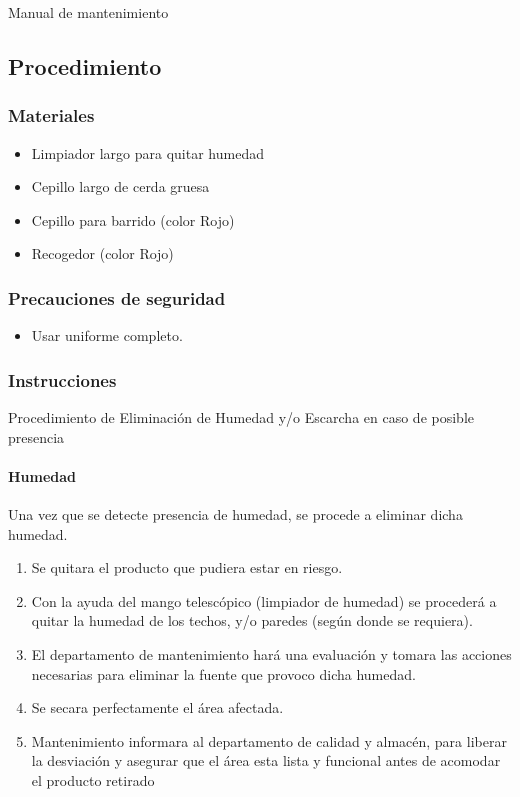Manual de mantenimiento %

\subsection{Procedimiento}

\subsubsection{Materiales}

\begin{itemize}
	\item Limpiador largo para quitar humedad
	\item Cepillo largo de cerda gruesa
	\item Cepillo para barrido (color Rojo)
	\item Recogedor (color Rojo)
\end{itemize}

\subsubsection{Precauciones de seguridad}

\begin{itemize}
	\item Usar uniforme completo.
\end{itemize}

\subsubsection{Instrucciones}

Procedimiento de Eliminación de Humedad y/o Escarcha en caso de posible presencia

\paragraph{Humedad}

Una vez que se detecte presencia de humedad, se procede a eliminar dicha humedad.

\begin{enumerate}
	\item Se quitara el producto que pudiera estar en riesgo.
	\item Con la ayuda del mango telescópico (limpiador de humedad) se procederá a quitar la humedad de los techos, y/o paredes (según donde se requiera).
	\item El departamento de mantenimiento hará una evaluación y tomara las acciones necesarias para eliminar la fuente que provoco dicha humedad.
	\item Se secara perfectamente el área afectada.
	\item Mantenimiento informara al departamento de calidad y almacén, para liberar la desviación y asegurar que el área esta lista y funcional antes de acomodar el producto retirado
\end{enumerate}


